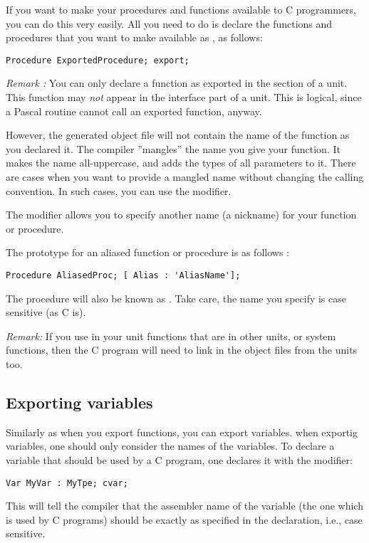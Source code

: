 \documentclass{report}
\begin{document}
If you want to make your procedures and functions available to C
programmers, you can do this very easily. All you need to do is declare the
functions and procedures that you want to make available as , as
follows:
\begin{verbatim}
Procedure ExportedProcedure; export;
\end{verbatim}

{\em Remark :} You can only declare a function as exported in the
 section of a unit. This function may {\em not} appear
in the interface part of a unit. This is logical, since a Pascal routine
cannot call an exported function, anyway.

However, the generated object file will not contain the name of the function
as you declared it. The \fpc compiler ''mangles'' the name you give your
function. It makes the name all-uppercase, and adds the types of all
parameters to it. There are cases when you want to provide a mangled name
without changing the calling convention. In such cases, you can use the
 modifier. 

The  modifier allows you to specify
another name (a nickname) for your function or procedure.

The prototype for an aliased function or procedure is as follows :
\begin{verbatim}
Procedure AliasedProc; [ Alias : 'AliasName'];
\end{verbatim}
The procedure  will also be known as . Take
care, the name you specify is case sensitive (as C is).

{\em Remark: }
If you use in your unit functions that are in other units, or
system functions, then the C program will need to link in the object files
from the units too.

\subsection{Exporting variables}

Similarly as when you export functions, you can export variables.
when exportig variables, one should only consider the names of the
variables. To declare a variable that should be used by a C program,
one declares it with the  modifier:
\begin{verbatim}
Var MyVar : MyTpe; cvar;
\end{verbatim}
This will tell the compiler that the assembler name of the variable (the one
which is used by C programs) should be exactly as specified in the 
declaration, i.e., case sensitive.
\end{document}
